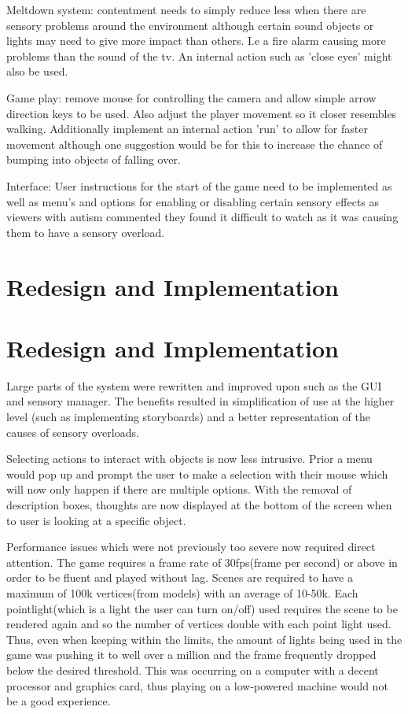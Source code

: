 \documentclass[11pt]{report}
\begin{document}
Meltdown system: contentment needs to simply reduce less when there are sensory problems around the environment although certain sound objects or lights may need to give more impact than others. I.e a fire alarm causing more problems than the sound of the tv. An internal action such as 'close eyes' might also be used. 

Game play: remove mouse for controlling the camera and allow simple arrow direction keys to be used. Also adjust the player movement so it closer resembles walking. Additionally implement an internal action 'run' to allow for faster movement although one suggestion would be for this to increase the chance of bumping into objects of falling over. 

Interface: User instructions for the start of the game need to be implemented as well as menu's and options for enabling or disabling certain sensory effects as viewers with autism commented they found it difficult to watch as it was causing them to have a sensory overload. 

\chapter{Redesign and Implementation}

\chapter{Redesign and Implementation}
Large parts of the system were rewritten and improved upon such as the GUI and sensory manager. The benefits resulted in simplification of use at the higher level (such as implementing storyboards) and a better representation of the causes of sensory overloads.

Selecting actions to interact with objects is now less intrusive. Prior a menu would pop up and prompt the user to make a selection with their mouse which will now only happen if there are multiple options. With the removal of description boxes, thoughts are now displayed at the bottom of the screen when to user is looking at a specific object.

Performance issues which were not previously too severe now required direct attention. The game requires a frame rate of 30fps(frame per second) or above in order to be fluent and played without lag. Scenes are required to have a maximum of 100k vertices(from models) with an average of 10-50k. Each pointlight(which is a light the user can turn on/off) used requires the scene to be rendered again and so the number of vertices double with each point light used. Thus, even when keeping within the limits, the amount of lights being used in the game was pushing it to well over a million and the frame frequently dropped below the desired threshold. This was occurring on a computer with a decent processor and graphics card, thus playing on a low-powered machine would not be a good experience.  
\end{document}
